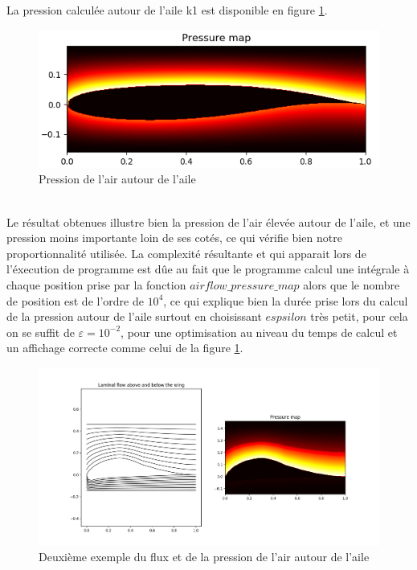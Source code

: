 \documentclass{article}
\begin{document}
La pression calculée autour de l'aile k1 est disponible en figure \ref{pressure_map}.
\begin{figure}[!htb]
    \centering
    \includegraphics[width=1.04\textwidth]{pressure_map.png}
    \caption{Pression de l'air autour de l'aile}
    \label{pressure_map}
\end{figure}
\\
Le résultat obtenues illustre bien la pression de l'air élevée autour de l'aile, et une pression moins importante loin de ses cotés, ce qui vérifie bien notre proportionnalité utilisée.
La complexité résultante et qui apparait lors de l'éxecution de programme est dûe au fait que le programme calcul une intégrale à chaque position prise par la fonction $airflow\_pressure\_map$ alors que le nombre de position est de l'ordre de $10^{4}$, ce qui explique bien la durée prise lors du calcul de la pression autour de l'aile surtout en choisissant $espsilon$ très petit, pour cela on se suffit de $\varepsilon = 10^{-2}$, pour une optimisation au niveau du temps de calcul et un affichage correcte comme celui de la figure \ref{pressure_map}.
\begin{figure}[!ht]
    \centering
    \includegraphics[width=1.04\textwidth]{pressure_map_L1003.png}
    \caption{Deuxième exemple du flux et de la pression de l'air autour de l'aile}
    \label{pressure_map_L1003}
\end{figure}
\end{document}
